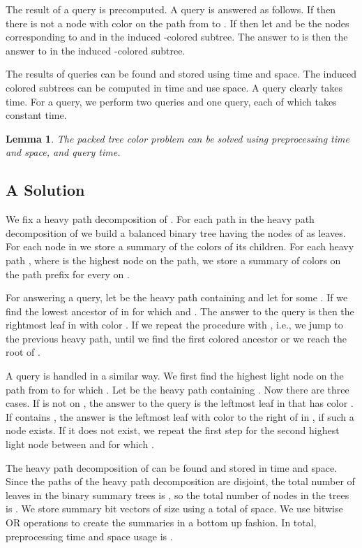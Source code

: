 \documentclass[11pt]{article}
\newtheorem{lemma}{Lemma}
\begin{document}
The result of a  query is precomputed. A  query is answered as follows. If  then there is not a node with color  on the path from  to . If  then let  and  be the nodes corresponding to  and  in the induced -colored subtree. The answer to  is then the answer to  in the induced -colored subtree.

The results of  queries can be found and stored using  time and space. The induced colored subtrees can be computed in  time and use  space. A  query clearly takes  time. For a  query, we perform two  queries and one  query, each of which takes constant time.

\begin{lemma}
The packed tree color problem can be solved using  preprocessing time and space, and  query time.
\end{lemma}


\subsection{A  Solution}




We fix a heavy path decomposition of . For each path  in the heavy path decomposition of  we build a balanced binary tree  having the nodes of  as leaves. For each node  in  we store a summary  of the colors of its children. For each heavy path , where  is the highest node on the path, we store a summary  of colors on the path prefix  for every  on . 

For answering a  query, let  be the heavy path containing  and let  for some . If  we find the lowest ancestor  of  in  for which  and . The answer to the query is then the rightmost leaf in  with color . If  we repeat the procedure with , i.e., we jump to the previous heavy path, until we find the first colored ancestor or we reach the root of .

A  query is handled in a similar way. We first find the highest light node  on the path from  to  for which . Let  be the heavy path containing . Now there are three cases. If  is not on , the answer to the query is the leftmost leaf in  that has color . If  contains , the answer is the leftmost leaf with color  to the right of  in , if such a node exists. If it does not exist, we repeat the first step for the second highest light node  between  and  for which .

The heavy path decomposition of  can be found and stored in  time and space. Since the paths of the heavy path decomposition are disjoint, the total number of leaves in the binary summary trees is , so the total number of nodes in the trees is . We store  summary bit vectors of size  using a total of  space. We use  bitwise OR operations to create the summaries in a bottom up fashion. In total, preprocessing time and space usage is .
\end{document}
